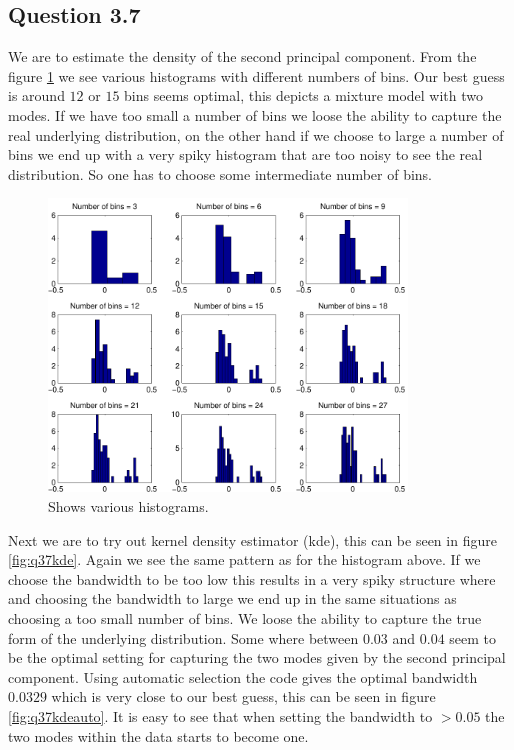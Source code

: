 \subsection*{Question 3.7}
We are to estimate the density of the second principal component. From
the figure \ref{fig:q37histograms} we see various histograms with
different numbers of bins. Our best guess is around $12$ or $15$ bins
seems optimal, this depicts a mixture model with two modes. If we have
too small a number of bins we loose the ability to capture the real
underlying distribution, on the other hand if we choose to large a
number of bins we end up with a very spiky histogram that are too
noisy to see the real distribution. So one has to choose some
intermediate number of bins.

\begin{figure}[!htbp]
  \centering
  \includegraphics[width=0.85\textwidth]{./images/q37histograms}
  \caption{Shows various histograms.}
  \label{fig:q37histograms}
\end{figure}

Next we are to try out kernel density estimator (kde), this can be
seen in figure \ref{fig:q37kde}. Again we see the same pattern as for
the histogram above. If we choose the bandwidth to be too low this
results in a very spiky structure where and choosing the bandwidth to
large we end up in the same situations as choosing a too small number
of bins. We loose the ability to capture the true form of the
underlying distribution. Some where between $0.03$ and $0.04$ seem to
be the optimal setting for capturing the two modes given by the second
principal component. Using automatic selection the code gives the
optimal bandwidth $0.0329$ which is very close to our best guess, this
can be seen in figure \ref{fig:q37kdeauto}. It is easy to see that
when setting the bandwidth to $>0.05$ the two modes within the data
starts to become one.


